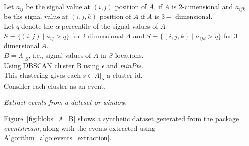 \documentclass[a4paper,11pt]{article}
\begin{document}
\DontPrintSemicolon
\begin{algorithm}\fontsize{9}{10}\selectfont
	Let $a_{ij}$ be the signal value at $(i, j)$ position of $A$, if $A$ is 2-dimensional and $a_{ijk}$ be the signal value at $(i, j, k)$ position of $A$ if $A$ is $3-$ dimensional. \\
	Let $q$ denote the $\alpha$-percentile of the signal values of $A$. \\
	$S = \{ (i,j) \mid a_{ij} > q \}$ for 2-dimensional $A$ and
	$S = \{ (i,j, k) \mid a_{ijk} > q \}$ for 3-dimensional $A$. \\
	$ B = A|_S$, i.e., signal values of $A$ in $S$ locations. \\
	Using DBSCAN cluster B using $\epsilon$ and \textit{minPts}. \\
	This clustering gives each $s \in A|_S$ a cluster id. \\

	Consider each cluster as an event. \,
	\caption{\itshape Extract events from a dataset or window.}
	\label{algo:events_extraction}
\end{algorithm}

Figure~\ref{fig:blobs_A_B} shows a  synthetic dataset generated from the package \textit{eventstream}, along with the events extracted using Algorithm~\ref{algo:events_extraction}.
\end{document}
